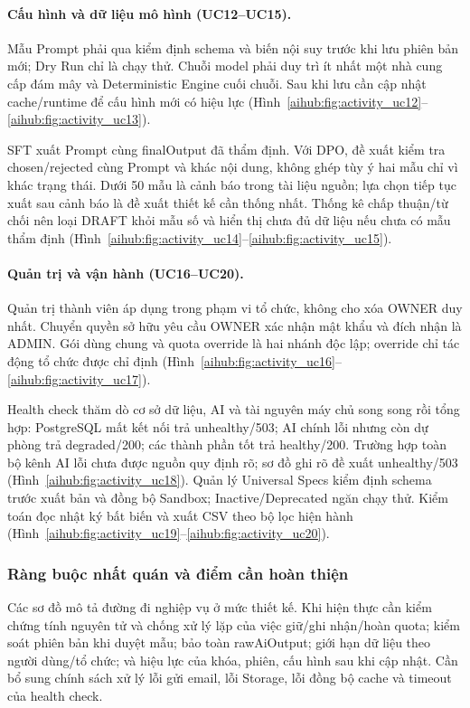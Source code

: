 \paragraph{Cấu hình và dữ liệu mô hình (UC12--UC15).}
Mẫu Prompt phải qua kiểm định schema và biến nội suy trước khi lưu phiên bản mới; Dry Run chỉ là chạy thử. Chuỗi model phải duy trì ít nhất một nhà cung cấp đám mây và Deterministic Engine cuối chuỗi. Sau khi lưu cần cập nhật cache/runtime để cấu hình mới có hiệu lực (Hình~\ref{aihub:fig:activity_uc12}--\ref{aihub:fig:activity_uc13}).

SFT xuất Prompt cùng finalOutput đã thẩm định. Với DPO, đề xuất kiểm tra chosen/rejected cùng Prompt và khác nội dung, không ghép tùy ý hai mẫu chỉ vì khác trạng thái. Dưới 50 mẫu là cảnh báo trong tài liệu nguồn; lựa chọn tiếp tục xuất sau cảnh báo là đề xuất thiết kế cần thống nhất. Thống kê chấp thuận/từ chối nên loại DRAFT khỏi mẫu số và hiển thị chưa đủ dữ liệu nếu chưa có mẫu thẩm định (Hình~\ref{aihub:fig:activity_uc14}--\ref{aihub:fig:activity_uc15}).

\paragraph{Quản trị và vận hành (UC16--UC20).}
Quản trị thành viên áp dụng trong phạm vi tổ chức, không cho xóa OWNER duy nhất. Chuyển quyền sở hữu yêu cầu OWNER xác nhận mật khẩu và đích nhận là ADMIN. Gói dùng chung và quota override là hai nhánh độc lập; override chỉ tác động tổ chức được chỉ định (Hình~\ref{aihub:fig:activity_uc16}--\ref{aihub:fig:activity_uc17}).

Health check thăm dò cơ sở dữ liệu, AI và tài nguyên máy chủ song song rồi tổng hợp: PostgreSQL mất kết nối trả unhealthy/503; AI chính lỗi nhưng còn dự phòng trả degraded/200; các thành phần tốt trả healthy/200. Trường hợp toàn bộ kênh AI lỗi chưa được nguồn quy định rõ; sơ đồ ghi rõ đề xuất unhealthy/503 (Hình~\ref{aihub:fig:activity_uc18}). Quản lý Universal Specs kiểm định schema trước xuất bản và đồng bộ Sandbox; Inactive/Deprecated ngăn chạy thử. Kiểm toán đọc nhật ký bất biến và xuất CSV theo bộ lọc hiện hành (Hình~\ref{aihub:fig:activity_uc19}--\ref{aihub:fig:activity_uc20}).

\subsubsection{Ràng buộc nhất quán và điểm cần hoàn thiện}

Các sơ đồ mô tả đường đi nghiệp vụ ở mức thiết kế. Khi hiện thực cần kiểm chứng tính nguyên tử và chống xử lý lặp của việc giữ/ghi nhận/hoàn quota; kiểm soát phiên bản khi duyệt mẫu; bảo toàn rawAiOutput; giới hạn dữ liệu theo người dùng/tổ chức; và hiệu lực của khóa, phiên, cấu hình sau khi cập nhật. Cần bổ sung chính sách xử lý lỗi gửi email, lỗi Storage, lỗi đồng bộ cache và timeout của health check.

